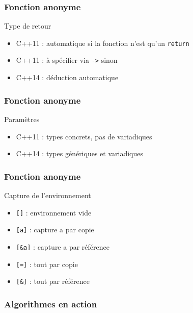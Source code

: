 \documentclass[svgnames]{beamer}
\begin{document}
\frame
{
  \frametitle{Fonction anonyme}
  \begin{block}{Type de retour}
  \begin{itemize}
  \item C++11 : automatique si la fonction n'est qu'un \texttt{return}
  \item C++11 : à spécifier via \texttt{->} sinon
  \item C++14 : déduction automatique
  \end{itemize}
  \end{block}
}

\frame
{
  \frametitle{Fonction anonyme}
  \begin{block}{Param\`etres}
  \begin{itemize}
  \item C++11 : types concrets, pas de variadiques\\

  \item C++14 : types g\'en\'eriques et variadiques\\
  \end{itemize}
  \end{block}
}

\frame
{
  \frametitle{Fonction anonyme}
  \begin{block}{Capture de l'environnement}
  \begin{itemize}
  \item \texttt{[]} : environnement vide
  \item \texttt{[a]} : capture a par copie
  \item \texttt{[\&a]} : capture a par r\'ef\'erence
  \item \texttt{[=]} : tout par copie
  \item \texttt{[\&]} : tout par r\'ef\'erence
  \end{itemize}
  \end{block}

}

\frame
{
  \frametitle{Algorithmes en action}
  \begin{overlayarea}{\textwidth}{\textheight}
  \end{overlayarea}
}
\end{document}
